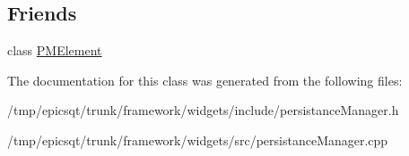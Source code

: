 \subsection*{Friends}
\begin{DoxyCompactItemize}
\item 
\hypertarget{classPersistanceManager_a9044d73aebbb01c7c72514c8ca06d590}{
class \hyperlink{classPersistanceManager_a9044d73aebbb01c7c72514c8ca06d590}{PMElement}}
\label{classPersistanceManager_a9044d73aebbb01c7c72514c8ca06d590}

\end{DoxyCompactItemize}


The documentation for this class was generated from the following files:\begin{DoxyCompactItemize}
\item 
/tmp/epicsqt/trunk/framework/widgets/include/persistanceManager.h\item 
/tmp/epicsqt/trunk/framework/widgets/src/persistanceManager.cpp\end{DoxyCompactItemize}
